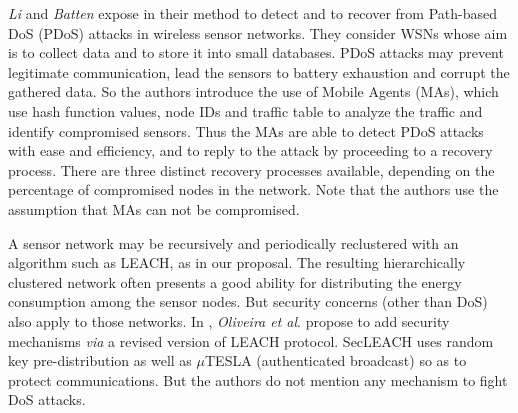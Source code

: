 
\textit{Li} and \textit{Batten} expose in
\cite{LB09}
their method to detect and to recover from Path-based DoS (PDoS) attacks in wireless sensor networks.
They consider WSNs whose aim is to collect data and to store it into small databases.
PDoS attacks may prevent legitimate communication, lead the sensors to battery exhaustion and corrupt the gathered data.
So the authors introduce the use of Mobile Agents (MAs), which use hash function values, node IDs and traffic table to analyze the traffic and identify compromised sensors.
Thus the MAs are able to detect PDoS attacks with ease and efficiency, and to reply to the attack by proceeding to a recovery process.
There are three distinct recovery processes available, depending on the percentage of compromised nodes in the network.
Note that the authors use the assumption that MAs can not be compromised.




A sensor network may be recursively and periodically reclustered with an algorithm such as LEACH, as in our proposal.
The resulting hierarchically clustered network often presents a good ability for distributing the energy consumption among the sensor nodes.
But security concerns (other than DoS) also apply to those networks.
In
\cite{OFVWBDL07},
\textit{Oliveira et al}. propose to add security mechanisms \textit{via} a revised version of LEACH protocol.
SecLEACH uses random key pre-distribution as well as $\mu$TESLA (authenticated broadcast) so as to protect communications.
But the authors do not mention any mechanism to fight DoS attacks.

